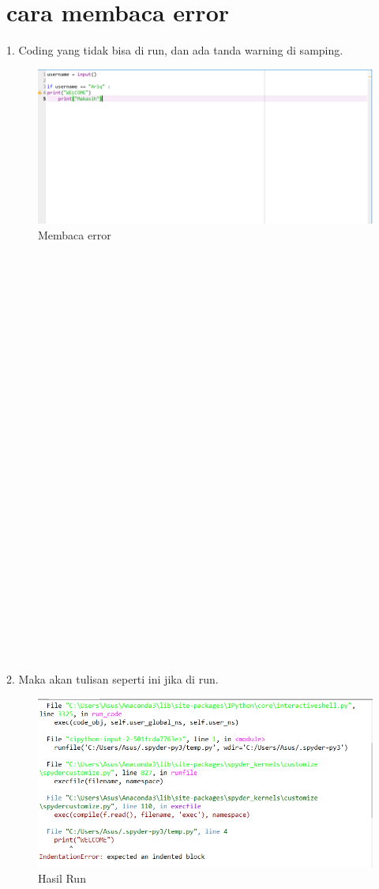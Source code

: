 \documentclass{article}
\begin{document}
\section{cara membaca error}
1. Coding yang tidak bisa di run, dan ada tanda warning di samping.
\begin{figure}[h]
	\centering
		\includegraphics[scale=0.4]{Gambar/E1}
	\caption{Membaca error}
\end{figure}
\\
\\
\\
\\
\\
\\
\\
\\
\\
\\
\\
\\
\\
\\
\\
\\
\\
\\
\\
\\
\\
\\
\\
\\
\\
\\
\\
2. Maka akan tulisan seperti ini jika di run.\\
\begin{figure}[h]
	\centering
		\includegraphics[scale=0.5]{Gambar/E2}
	\caption{Hasil Run}
\end{figure}
\end{document}
